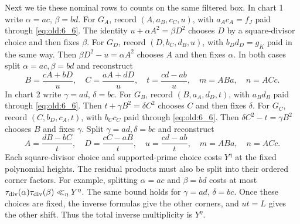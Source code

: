Next we tie these nominal rows to counts on the same filtered box.
In chart 1 write \(\alpha=ac\), \(\beta=bd\). For \(G_A\), record
\((A,a_B,c_C,u)\), with \(a_Ac_A=f_J\) paid through
\eqref{eq:old:6_6}. The identity
\(u+\alpha A^2=\beta D^2\) chooses \(D\) by a square-divisor choice and
then fixes \(\beta\). For \(G_D\), record
\((D,b_C,d_B,u)\), with \(b_Dd_D=g_K\) paid in the same way. Then
\(\beta D^2-u=\alpha A^2\) chooses \(A\)
and then fixes \(\alpha\). In both cases split \(\alpha=ac,\beta=bd\)
and reconstruct
\[
 B=\frac{cA+bD}{u},\quad C=\frac{aA+dD}{u},\quad
 t=\frac{cd-ab}{u},\quad m=ABa,\quad n=ACc.
\]
In chart 2 write \(\gamma=ad\), \(\delta=bc\). For \(G_B\), record
\((B,a_A,d_D,t)\), with \(a_Bd_B\) paid through \eqref{eq:old:6_6}.
Then \(t+\gamma B^2=\delta C^2\) chooses \(C\)
and then fixes \(\delta\). For \(G_C\), record \((C,b_D,c_A,t)\), with
\(b_Cc_C\) paid through \eqref{eq:old:6_6}. Then
\(\delta C^2-t=\gamma B^2\) chooses \(B\) and fixes \(\gamma\).
Split \(\gamma=ad,\delta=bc\) and reconstruct
\[
 A=\frac{dB-bC}{t},\quad D=\frac{cC-aB}{t},\quad
 u=\frac{cd-ab}{t},\quad m=ABa,\quad n=ACc.
\]
Each square-divisor choice and supported-prime choice costs \(Y^\eta\)
at the fixed polynomial heights. The residual products must also be split
into their ordered corner factors. For example, splitting
\(\alpha=ac\) and \(\beta=bd\) costs at most
\(\tau_{\mathrm{div}}(\alpha)\tau_{\mathrm{div}}(\beta)\ll_\eta Y^\eta\). The same bound holds
for \(\gamma=ad\), \(\delta=bc\). Once these choices are fixed, the
inverse formulas give the other corners, and \(ut=L\) gives
the other shift. Thus the total inverse multiplicity is \(Y^\eta\).

